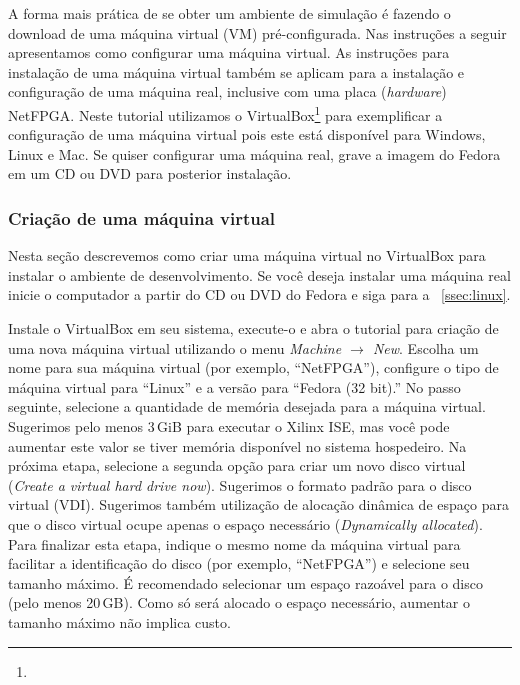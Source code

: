 A forma mais prática de se obter um ambiente de simulação é fazendo
o download de uma máquina virtual (VM) pré-configurada. Nas
instruções a seguir apresentamos como configurar uma máquina
virtual.  As instruções para instalação de uma máquina virtual
também se aplicam para a instalação e configuração de uma máquina
real, inclusive com uma placa (\emph{hardware}) NetFPGA.  Neste
tutorial utilizamos o
VirtualBox\footnote{} para
exemplificar a configuração de uma máquina virtual pois este está
disponível para Windows, Linux e Mac.  Se quiser configurar uma
máquina real, grave a imagem do Fedora em um CD ou DVD para
posterior instalação.

\subsubsection{Criação de uma máquina virtual}

Nesta seção descrevemos como criar uma máquina virtual no VirtualBox
para instalar o ambiente de desenvolvimento.  Se você deseja
instalar uma máquina real inicie o computador a partir do CD ou DVD
do Fedora e siga para a \secstr~\ref{ssec:linux}.


Instale o VirtualBox em seu sistema, execute-o e abra o tutorial
para criação de uma nova máquina virtual utilizando o menu
\emph{Machine $\rightarrow$ New}.  Escolha um nome para sua máquina
virtual (por exemplo, ``NetFPGA''), configure o tipo de máquina
virtual para ``Linux'' e a versão para ``Fedora (32 bit).''  No
passo seguinte, selecione a quantidade de memória desejada para a
máquina virtual.  Sugerimos pelo menos 3\,GiB para executar o Xilinx
ISE, mas você pode aumentar este valor se tiver memória disponível
no sistema hospedeiro.  Na próxima etapa, selecione a segunda opção
para criar um novo disco virtual (\emph{Create a virtual hard drive
now}).  Sugerimos o formato padrão para o disco virtual (VDI).
Sugerimos também utilização de alocação dinâmica de espaço para que
o disco virtual ocupe apenas o espaço necessário (\emph{Dynamically
allocated}).  Para finalizar esta etapa, indique o mesmo nome da
máquina virtual para facilitar a identificação do disco (por
exemplo, ``NetFPGA'') e selecione seu tamanho máximo.  É recomendado
selecionar um espaço razoável para o disco (pelo menos 20\,GB).
Como só será alocado o espaço necessário, aumentar o tamanho máximo
não implica custo.

